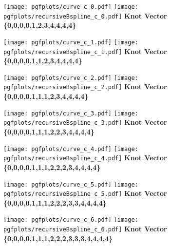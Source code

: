 \documentclass{article}
\begin{document}
\begin{center}
  \begin{minipage}{0.49\linewidth}
    \centering
    \texttt{[image: pgfplots/curve\_c\_0.pdf]}
    \texttt{[image: pgfplots/recursiveBspline\_c\_0.pdf]}
    {\scriptsize \textbf{Knot Vector}} \\
    {\scriptsize \textbf{\{0,0,0,0,1,2,3,4,4,4,4\}}}
  \end{minipage}
  \begin{minipage}{0.49\linewidth}
    \centering
    \texttt{[image: pgfplots/curve\_c\_1.pdf]}
    \texttt{[image: pgfplots/recursiveBspline\_c\_1.pdf]}
    {\scriptsize \textbf{Knot Vector}} \\
    {\scriptsize \textbf{\{0,0,0,0,1,1,2,3,4,4,4,4\}}}
  \end{minipage}
  \begin{minipage}{0.49\linewidth}
    \centering
    \texttt{[image: pgfplots/curve\_c\_2.pdf]}
    \texttt{[image: pgfplots/recursiveBspline\_c\_2.pdf]}
    {\scriptsize \textbf{Knot Vector}} \\
    {\scriptsize \textbf{\{0,0,0,0,1,1,1,2,3,4,4,4,4\}}}
  \end{minipage}
  \begin{minipage}{0.49\linewidth}
    \centering
    \texttt{[image: pgfplots/curve\_c\_3.pdf]}
    \texttt{[image: pgfplots/recursiveBspline\_c\_3.pdf]}
    {\scriptsize \textbf{Knot Vector}} \\
    {\scriptsize \textbf{\{0,0,0,0,1,1,1,2,2,3,4,4,4,4\}}}
  \end{minipage}
  \begin{minipage}{0.49\linewidth}
    \centering
    \texttt{[image: pgfplots/curve\_c\_4.pdf]}
    \texttt{[image: pgfplots/recursiveBspline\_c\_4.pdf]}
    {\scriptsize \textbf{Knot Vector}} \\
    {\scriptsize \textbf{\{0,0,0,0,1,1,1,2,2,2,3,4,4,4,4\}}}
  \end{minipage}
  \begin{minipage}{0.49\linewidth}
    \centering
    \texttt{[image: pgfplots/curve\_c\_5.pdf]}
    \texttt{[image: pgfplots/recursiveBspline\_c\_5.pdf]}
    {\scriptsize \textbf{Knot Vector}} \\
    {\scriptsize \textbf{\{0,0,0,0,1,1,1,2,2,2,3,3,4,4,4,4\}}}
  \end{minipage}
  \begin{minipage}{0.49\linewidth}
    \centering
    \texttt{[image: pgfplots/curve\_c\_6.pdf]}
    \texttt{[image: pgfplots/recursiveBspline\_c\_6.pdf]}
    {\scriptsize \textbf{Knot Vector}} \\
    {\scriptsize \textbf{\{0,0,0,0,1,1,1,2,2,2,3,3,3,4,4,4,4\}}}
  \end{minipage}
\end{center}
\end{document}

